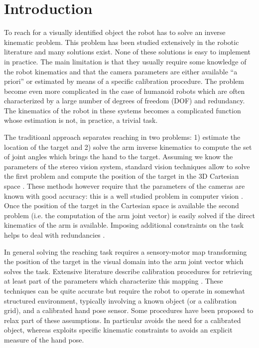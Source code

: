 \section{Introduction}
To reach for a visually identified object the robot has to solve
an inverse kinematic problem. This 
problem has been studied extensively in the robotic literature 
and many solutions exist. None of these solutions is easy to 
implement in practice. The main limitation is that they usually require 
some knowledge of the robot kinematics and that the camera parameters 
are either available ``a priori'' or estimated by means of a specific
calibration procedure. The problem become even more complicated 
in the case of humanoid robots which are often characterized by 
a large number of degrees of freedom (DOF) and redundancy. The 
kinematics of the robot in these systems becomes a complicated 
function whose estimation is not, in practice, a trivial task.

The traditioanl approach separates reaching in two
problems: 1) estimate the location of the target and
2) solve the arm inverse kinematics to compute the set of joint
angles which brings the hand to the target. Assuming we know the 
parameters of the stereo vision system, standard vision techniques
allow to solve the first problem and compute the position of the 
target in the 3D Cartesian space \cite{Soatto03vision}. These methods 
however require that the parameters of the cameras are known with 
good accuracy: this is a well studied problem in computer 
vision \cite{Soatto03vision}. Once the 
position of the target in the Cartesian space is available 
the second problem (i.e. the computation of the arm joint vector) is 
easily solved if the direct kinematics of the arm is available. 
Imposing additional constraints on the task helps to deal with 
redundancies \cite{liegeois77automatic}.

In general solving the reaching task requires a sensory-motor map
transforming the position of the target in the visual domain into the 
arm joint vector which solves the task. Extensive literature describe 
calibration procedures for retrieving at least part of the parameters 
which characterize this mapping 
\cite{Holerbach96calibration,Tsai88Calibration}. 
These techniques can be quite accurate but require the robot to operate
in somewhat structured environment, typically involving a known object (or
a calibration grid), and a calibrated hand pose sensor. Some procedures 
have been proposed to relax part of these assumptions. In particular 
\cite{AHE01} avoids the need for a calibrated object, whereas 
\cite{Bennett91calibration} exploits specific kinematic constraints 
to avoids an explicit measure of the hand pose.

